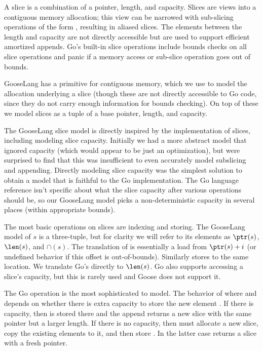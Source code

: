 A slice is a combination of a pointer, length, and capacity. Slices are
views into a contiguous memory allocation; this view can be narrowed
with sub-slicing operations of the form , resulting
in aliased slices. The elements between the length and capacity are not
directly accessible but are used to support efficient amortized appends.
Go's built-in slice operations include bounds checks on all slice
operations and panic if a memory access or sub-slice operation goes out
of bounds.

GooseLang has a primitive for contiguous memory, which we use to model
the allocation underlying a slice (though these are not directly
accessible to Go code, since they do not carry enough information for
bounds checking). On top of these we model slices as a tuple of a base
pointer, length, and capacity.

The GooseLang slice model is directly inspired by the implementation of
slices, including modeling slice capacity. Initially we had a more
abstract model that ignored capacity (which would appear to be just an
optimization), but were surprised to find that this was insufficient to
even accurately model subslicing and appending. Directly modeling slice
capacity was the simplest solution to obtain a model that is faithful to
the Go implementation. The Go language reference isn't specific about
what the slice capacity after various operations should be, so our
GooseLang model picks a non-deterministic capacity in several places
(within appropriate bounds).


The most basic operations on slices are indexing and storing. The
GooseLang model of $s$ is a three-tuple, but for clarity we will refer
to its elements as $\ptr(s)$, $\len(s)$, and $\cap(s)$. The
translation of  is essentially a load from
$\ptr(s) + i$ (or undefined behavior if this offset is out-of-bounds).
Similarly  stores to the same location. We
translate Go's  directly to $\len(s)$. Go also supports
accessing a slice's capacity, but this is rarely used and Goose does not
support it.

The Go  operation is the most sophisticated to model. The
behavior of  where  and
 depends on whether there is extra capacity to store the
new element . If there is capacity, then  is stored
there and the append returns a new slice with the same pointer but a
larger length. If there is no capacity, then  must
allocate a new slice, copy the existing elements to it, and then store
. In the latter case  returns a slice with a
fresh pointer.

